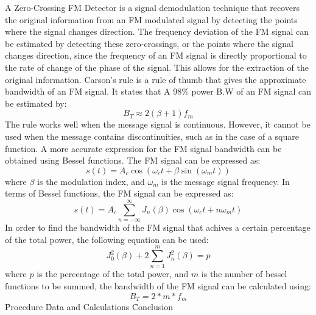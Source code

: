 \documentclass[12pt]{article}
\begin{document}
A Zero-Crossing FM Detector is a signal demodulation technique that recovers the original information from an FM modulated signal by detecting the points where the signal changes direction. The frequency deviation of the FM signal can be estimated by detecting these zero-crossings, or the points where the signal changes direction, since the frequency of an FM signal is directly proportional to the rate of change of the phase of the signal. This allows for the extraction of the original information.\cite{eecite}
Carson's rule is a rule of thumb that gives the approximate bandwidth of an FM signal. It states that A 98\% power B.W of an FM signal can be estimated by:
\begin{equation}
    B_T \approx 2(\beta + 1)f_m
\end{equation}
The rule works well when the message signal is continuous. However, it cannot be used when the message contains discontinuities, such as in the case of a square function. \cite{tutorialspoint}
A more accurate expression for the FM signal bandwidth can be obtained using Bessel functions. The FM signal can be expressed as:
\begin{equation}
    s(t) = A_c \cos({\omega}_c t + \beta\sin({\omega}_m t))
\end{equation} 
where $\beta$ is the modulation index, and ${\omega}_m$ is the message signal frequency. In terms of Bessel functions, the FM signal can be expressed as:
\begin{equation}
    s(t) = A_c \sum_{n=-\infty}^{\infty} J_n(\beta) \cos({\omega}_c t + n{\omega}_m t)
\end{equation}
In order to find the bandwidth of the FM signal that achives a certain percentage of the total power, the following equation can be used:
\begin{equation}
    J_0^{2}(\beta) + 2\sum_{n=1}^{m} J_n^{2}(\beta) = p
\end{equation}
where $p$ is the percentage of the total power, and $m$ is the number of bessel functions to be summed, the bandwidth of the FM signal can be calculated using:
\begin{equation}
    B_T = 2*m*f_m
\end{equation}
\clearpage
\h{Procedure}
\h{Data and Calculations}
\h{Conclusion}
\clearpage
\end{document}
